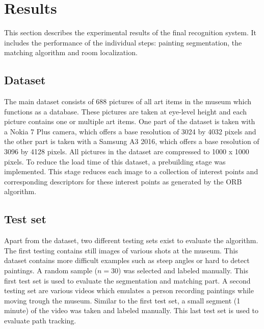 \section{Results}
\label{sec:results}
This section describes the experimental results of the final recognition system. It includes the performance of the individual steps: painting segmentation, the matching algorithm and room localization. 


\subsection{Dataset}
The main dataset consists of 688 pictures of all art items in the museum which functions as a database. These pictures are taken at eye-level height and each picture contains one or multiple art items. One part of the dataset is taken with a Nokia 7 Plus camera, which offers a base resolution of 3024 by 4032 pixels and the other part is taken with a Samsung A3 2016, which offers a base resolution of 3096 by 4128 pixels. All pictures in the dataset are compressed to 1000 x 1000 pixels. To reduce the load time of this dataset, a prebuilding stage was implemented. This stage reduces each image to a collection of interest points and corresponding descriptors for these interest points as generated by the ORB \cite{Rublee2011} algorithm. 

\subsection{Test set}
Apart from the dataset, two different testing sets exist to evaluate the algorithm. The first testing contains still images of various shots at the museum. This dataset contains more difficult examples such as steep angles or hard to detect paintings. A random sample ($n = 30$) was selected and labeled manually. This first test set is used to evaluate the segmentation and matching part. A second testing set are various videos which emulates a person recording paintings while moving trough the museum. Similar to the first test set, a small segment (1 minute) of the video was taken and labeled manually. This last test set is used to evaluate path tracking.

